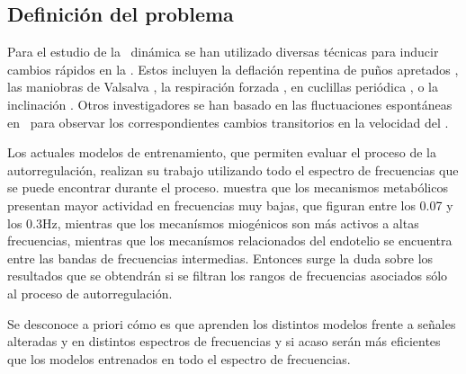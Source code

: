 \subsection{Definición del problema}
Para el estudio de la \ca\, dinámica se han utilizado diversas técnicas para inducir cambios rápidos en la \pam. Estos incluyen la deflación repentina de puños apretados \citep{Aaslid1989, Tiecks1995a}, las maniobras de Valsalva \citep{Greenfield1984, Tiecks1995a}, la respiración forzada \citep{Diehl1995}, en cuclillas periódica \citep{Birch1995}, o la inclinación \citep{Anthony1993}. Otros investigadores se han basado en las fluctuaciones espontáneas en \pam\, para observar los correspondientes cambios transitorios en la velocidad del \cbf.

Los actuales modelos de entrenamiento, que permiten evaluar el proceso de la autorregulación, realizan su trabajo utilizando todo el espectro de frecuencias que se puede encontrar durante el proceso. \cite{Zhang1998} muestra que los mecanismos metabólicos presentan mayor actividad en frecuencias muy bajas, que figuran entre los 0.07 y los 0.3Hz, mientras que los mecanísmos miogénicos son más activos a altas frecuencias, mientras que los mecanísmos relacionados del endotelio se encuentra entre las bandas de frecuencias intermedias. Entonces surge la duda sobre los resultados que se obtendrán si se filtran los rangos de frecuencias asociados sólo al proceso de autorregulación.

Se desconoce a priori cómo es que aprenden los distintos modelos frente a señales alteradas y en distintos espectros de frecuencias y si acaso serán más eficientes que los modelos entrenados en todo el espectro de frecuencias.
